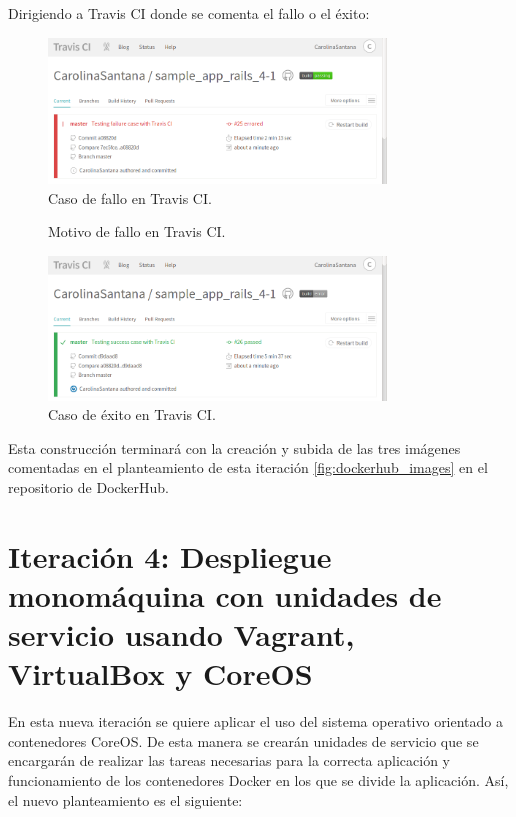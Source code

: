 Dirigiendo a Travis CI donde se comenta el fallo o el éxito:

\begin{figure}[H]
\centering
\includegraphics[width=0.8\textwidth]{images/figures/travisfailure2.png}
\caption{Caso de fallo en Travis CI.}
\end{figure}

\begin{figure}[H]
\centering
{}
\caption{Motivo de fallo en Travis CI.}
\end{figure}

\begin{figure}[H]
\centering
\includegraphics[width=0.8\textwidth]{images/figures/travissuccess2.png}
\caption{Caso de éxito en Travis CI.}
\end{figure}

Esta construcción terminará con la creación y subida de las tres imágenes comentadas en el planteamiento de esta iteración \ref{fig:dockerhub_images} en el repositorio de DockerHub.

\section{Iteración 4: Despliegue monomáquina con unidades de servicio usando Vagrant, VirtualBox y CoreOS}

En esta nueva iteración se quiere aplicar el uso del sistema operativo orientado a contenedores CoreOS. De esta manera se crearán unidades de servicio  que se encargarán de realizar las tareas necesarias para la correcta aplicación y funcionamiento de los contenedores Docker en los que se divide la aplicación. Así, el nuevo planteamiento es el siguiente:

